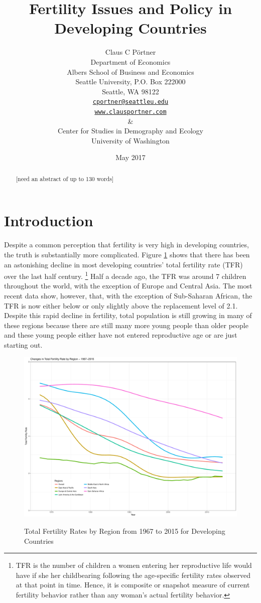 \documentclass[letterpaper,12pt]{article}
\title{Fertility Issues and Policy in Developing Countries}
\author{Claus C P\"ortner\\
    Department of Economics\\
    Albers School of Business and Economics\\
    Seattle University, P.O. Box 222000\\
    Seattle, WA 98122\\
    \href{mailto:cportner@seattleu.edu}{\texttt{cportner@seattleu.edu}}\\
    \href{http://www.clausportner.com}{\texttt{www.clausportner.com}}\\
    \& \\
    Center for Studies in Demography and Ecology \\
    University of Washington\\ \vspace{2cm}
    }
\date{May 2017}
\begin{document}
\maketitle
\thispagestyle{empty}

\begin{abstract}
[need an abstract of up to 130 words]
\end{abstract}

\newpage 

\doublespacing

\section{Introduction}

Despite a common perception that fertility is very high in developing
countries, the truth is substantially more complicated.
Figure \ref{fig:TFR} shows that there has been an astonishing decline in
most developing countries' total fertility rate (TFR) over the last half
century.%
\footnote{
TFR is the number of children a women entering her reproductive life
would have if she her childbearing following the age-specific fertility
rates observed at that point in time.
Hence, it is composite or snapshot measure of current fertility
behavior rather than any woman's actual fertility behavior.}
Half a decade ago, the TFR was around 7 children throughout the world,
with the exception of Europe and Central Asia.
The most recent data show, however, that, with the exception of
Sub-Saharan African, the TFR is now either below or only slightly above
the replacement level of 2.1.
Despite this rapid decline in fertility, total population is still
growing in many of these regions because there are still many more young
people than older people and these young people either have not entered
reproductive age or are just starting out.

\begin{figure}[hp]
    \centering
    \caption{Total Fertility Rates by Region from 1967 to 2015 for Developing Countries}
    \includegraphics[width=0.75\linewidth]{../figures/totalFertilityRates.pdf}
    \label{fig:TFR}
\end{figure}
\end{document}
